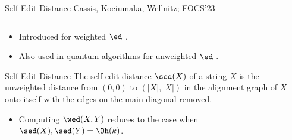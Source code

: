  \begin{frame}{Self-Edit Distance \hfill Cassis, Kociumaka, Wellnitz; FOCS'23}
    \begin{columns}
        \begin{column}{0.5\textwidth}
            \begin{itemize}
                \item Introduced for weighted $\ed$ .
                \item Also used in quantum algorithms for unweighted $\ed$ .
            \end{itemize}\pause
            \begin{block}{Self-Edit Distance}
                The self-edit distance $\sed(X)$ of a string $X$ is the unweighted distance from $(0, 0)$ to $(|X|, |X|)$ in the alignment graph of $X$ onto itself with the edges on the main diagonal removed.
            \end{block}
            \begin{itemize}
                \item<6-> Computing $\wed(X,Y)$ reduces to the case when $\sed(X), \sed(Y) = \Oh(k)$.
            \end{itemize}
        \end{column}
        \begin{column}{0.5\textwidth}
            \begin{center}
\end{center}
\end{column}
\end{columns}
\end{frame}
